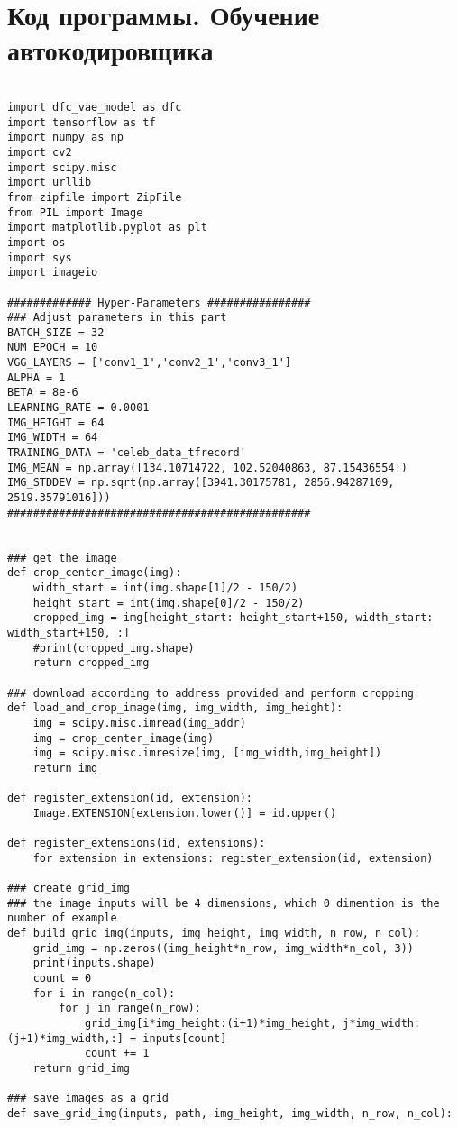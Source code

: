 \section*{\centering Код программы. Обучение автокодировщика}
\begin{footnotesize}
\begin{lstlisting}

import dfc_vae_model as dfc
import tensorflow as tf
import numpy as np
import cv2
import scipy.misc
import urllib
from zipfile import ZipFile
from PIL import Image
import matplotlib.pyplot as plt
import os
import sys
import imageio

############# Hyper-Parameters ################
### Adjust parameters in this part
BATCH_SIZE = 32
NUM_EPOCH = 10
VGG_LAYERS = ['conv1_1','conv2_1','conv3_1']
ALPHA = 1
BETA = 8e-6
LEARNING_RATE = 0.0001
IMG_HEIGHT = 64
IMG_WIDTH = 64
TRAINING_DATA = 'celeb_data_tfrecord'
IMG_MEAN = np.array([134.10714722, 102.52040863, 87.15436554])
IMG_STDDEV = np.sqrt(np.array([3941.30175781, 2856.94287109, 2519.35791016]))
###############################################


### get the image
def crop_center_image(img):
    width_start = int(img.shape[1]/2 - 150/2)
    height_start = int(img.shape[0]/2 - 150/2)
    cropped_img = img[height_start: height_start+150, width_start: width_start+150, :]
    #print(cropped_img.shape)
    return cropped_img

### download according to address provided and perform cropping
def load_and_crop_image(img, img_width, img_height):
    img = scipy.misc.imread(img_addr)
    img = crop_center_image(img)
    img = scipy.misc.imresize(img, [img_width,img_height])
    return img

def register_extension(id, extension):
    Image.EXTENSION[extension.lower()] = id.upper()

def register_extensions(id, extensions): 
    for extension in extensions: register_extension(id, extension)

### create grid_img
### the image inputs will be 4 dimensions, which 0 dimention is the number of example
def build_grid_img(inputs, img_height, img_width, n_row, n_col):
    grid_img = np.zeros((img_height*n_row, img_width*n_col, 3))
    print(inputs.shape)
    count = 0
    for i in range(n_col):
        for j in range(n_row):
            grid_img[i*img_height:(i+1)*img_height, j*img_width:(j+1)*img_width,:] = inputs[count]
            count += 1
    return grid_img
    
### save images as a grid
def save_grid_img(inputs, path, img_height, img_width, n_row, n_col):
    

\end{lstlisting}
\end{footnotesize}
